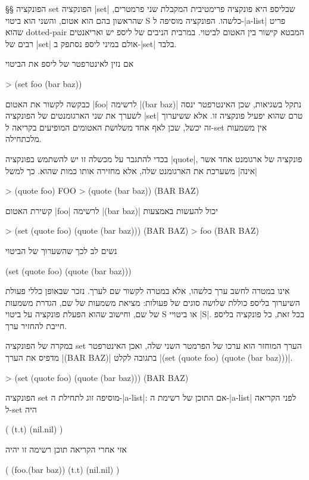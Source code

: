 §§ הפונקציה set
הפונקציה \T|set| שבליספ היא פונקציה פרימטיבית המקבלת שני פרמטרים, שהראשון בהם
הוא אטום, והשני הוא ביטוי S כלשהו. הפונקציה מוסיפה ל-\E|a-list| פריט שהוא
dotted-pair
המבטא קישור בין האטום לביטוי. במרבית הניבים של ליספ יש ואריאנטים רבים של
\T|set| אולם במיני ליספ נסתפק ב-\T|set| בלבד.

אם נזין לאינטרפטר של ליספ את הביטוי
\begin{LISP}
> (set foo (bar baz))
\end{LISP}
כבקשה לקשור את האטום \T|foo| לרשימה \T|(bar baz)|
נתקל בשגיאות, שכן האינטרפטר ינסה לשערך את שני הארגומנטים של הפונקציה \E|set|
טרם שהוא יפעיל פונקציה זו. אלא ששיערוך זה יכשל, שכן לאף אחד משלושת האטומים
המופיעים בקריאה ל-set אין משמעות מלכתחילה.

בכדי להתגבר על מכשלה זו יש להשתמש בפונקציה \T|quote|, פונקציה של ארגומנט אחד
אשר \ע|אינה| משערכת את הארגומנט שלה, אלא מחזירה אותו כמות שהוא.
כך למשל
\begin{LISP}
> (quote foo)
FOO
> (quote (bar baz))
(BAR BAZ)
\end{LISP}
קשירת האטום \T|foo| לרשימה \T|(bar baz)| יכול להעשות באמצעות
\begin{LISP}
> (set (quote foo) (quote (bar baz)))
(BAR BAZ)
> foo
(BAR BAZ)
\end{LISP}
נשים לב לכך שהשערוך של הביטוי
\begin{LISP}
(set (quote foo) (quote (bar baz)))
\end{LISP}
אינו במטרה לחשב ערך כלשהו, אלא במטרה לקשור שם לערך. נזכר שבאופן כללי פעולת
השיערוך בליספ כוללת שלושה סוגים של פעולות: מציאת משמעות של שם, הגדרת
משמעות של שם, וחישוב שהוא הפעלת פונקציה על ביטוי S או ביטויי \E|S|.
בכל זאת, כל פונקציה בליספ חייבת להחזיר ערך.

במקרה של הפונקציה set הערך המוחזר הוא ערכו של הפרמטר השני שלה, ואכן האינטרפטר
מדפיס את הערך \T|(BAR BAZ)| בתגובה לקלט \T|(set (quote foo) (quote (bar
baz)))|.

\begin{LISP}
> (set (quote foo) (quote (bar baz)))
(BAR BAZ)
\end{LISP}

הפונקציה set מוסיפה זוג לתחילת ה-\E|a-list|: אם התוכן של רשימת ה-\E|a-list|
לפני הקריאה ל-set היה \begin{LISP}
(
  (t.t)
  (nil.nil)
)
\end{LISP}

\minipage\textwidth
אזי אחרי הקריאה תוכן רשימה זו יהיה
\begin{LISP}
(
  (foo.(bar baz))
  (t.t)
  (nil.nil)
)
\end{LISP}
\endminipage

